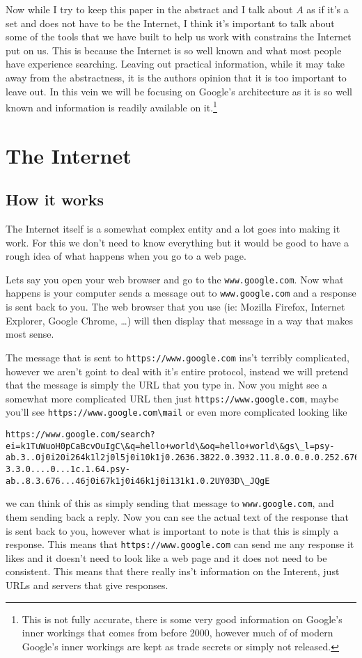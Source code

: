 \documentclass{article}
\begin{document}
	Now while I try to keep this paper in the abstract and I talk about $A$ as if it's a set and does not have to be the Internet, I think it's important to talk about some of the tools that we have built to help us work with constrains the Internet put on us. This is because the Internet is so well known and what most people have experience searching. Leaving out practical information, while it may take away from the abstractness, it is the authors opinion that it is too important to leave out. In this vein we will be focusing on Google's architecture as it is so well known and information is readily available on it.\footnote{This is not fully accurate, there is some very good information on Google's inner workings that comes from before 2000, however much of of modern Google's inner workings are kept as trade secrets or simply not released.}
	
	
	
	
	\section{The Internet}
	
	\subsection{How it works}
	The Internet itself is a somewhat complex entity and a lot goes into making it work. For this we don't need to know everything  but it would be good to have a rough idea of what happens when you go to a web page.
	
	Lets say you open your web browser and go to the \verb|www.google.com|. Now what happens is your computer sends a message out to \verb|www.google.com| and a response is sent back to you. The web browser that you use (ie: Mozilla Firefox, Internet Explorer, Google Chrome, \ldots) will then display that message in a way that makes most sense.
	
	The message that is sent to \verb|https://www.google.com| ins't terribly complicated, however we aren't goint to deal with it's entire protocol, instead we will pretend that the message is simply the URL that you type in. Now you might see a somewhat more complicated URL then just \verb|https://www.google.com|, maybe you'll see \verb|https://www.google.com\mail| or even more complicated looking like
	\begin{lstlisting}[breaklines]
	https://www.google.com/search?ei=k1TuWuoH0pCaBcvOuIgC\&q=hello+world\&oq=hello+world\&gs\_l=psy-ab.3..0j0i20i264k1l2j0l5j0i10k1j0.2636.3822.0.3932.11.8.0.0.0.0.252.676.2-3.3.0....0...1c.1.64.psy-ab..8.3.676...46j0i67k1j0i46k1j0i131k1.0.2UY03D\_JQgE
	\end{lstlisting}
	we can think of this as simply sending that message to \verb|www.google.com|, and them sending back a reply. Now you can see the actual text of the response that is sent back to you, however what is important to note is that this is simply a response. This means that \verb|https://www.google.com| can send me any response it likes and it doesn't need to look like a web page and it does not need to be consistent. This means that there really ins't information on the Interent, just URLs and servers that give responses.
	
\end{document}
